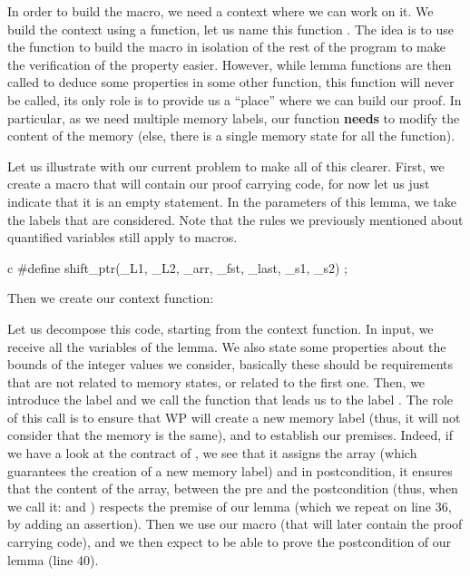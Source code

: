In order to build the macro, we need a context where we can work on it. We build
the context using a function, let us name this function
. The idea is to use the function to
build the macro in isolation of the rest of the program to make the verification
of the property easier. However, while lemma functions are then called to deduce
some properties in some other function, this function will never be called, its
only role is to provide us a ``place'' where we can build our proof. In
particular, as we need multiple memory labels, our function \textbf{needs} to
modify the content of the memory (else, there is a single memory state for all
the function).



Let us illustrate with our current problem to make all of this clearer. First,
we create a macro  that will contain our proof carrying
code, for now let us just indicate that it is an empty statement. In the
parameters of this lemma, we take the labels that are considered. Note that the
rules we previously mentioned about quantified variables still apply to macros.


\begin{CodeBlock}{c}
#define shift_ptr(_L1, _L2, _arr, _fst, _last, _s1, _s2) ;
\end{CodeBlock}


Then we create our context function:




Let us decompose this code, starting from the context function. In input, we
receive all the variables of the lemma. We also state some properties about the
bounds of the integer values we consider, basically these should be requirements
that are not related to memory states, or related to the first one. Then, we
introduce the label
 and we call the function  that leads
us to the label . The role of this call is to ensure that WP will
create a new memory label (thus, it will not consider that the memory is the
same), and to establish our premises. Indeed, if we have a look at the contract
of , we see that it assigns the array (which
guarantees the creation of a new memory label) and in postcondition, it ensures
that the content of the array, between the pre and the postcondition (thus, when
we call it:  and ) respects the premise of our
lemma (which we repeat on line 36, by adding an assertion). Then we use our
 macro (that will later contain the proof carrying code),
and we then expect to be able to prove the postcondition of our lemma (line 40).



